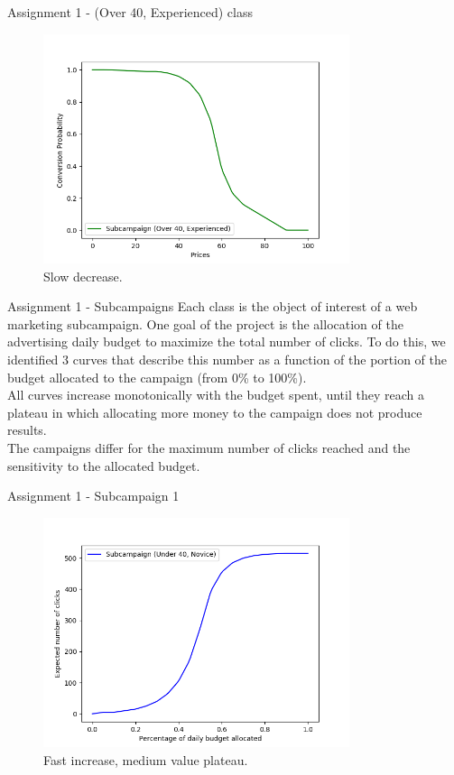 \documentclass[11pt]{beamer}
\begin{document}
\begin{frame}{Assignment 1 - (Over 40, Experienced) class}
\begin{figure}[hbtp]
\centering
\includegraphics[width=0.8\textwidth]{images/demand_curve_1.png}
\caption{Slow decrease.}
\end{figure}
\end{frame}

\begin{frame}{Assignment 1 - Subcampaigns}
Each class is the object of interest of a web marketing subcampaign.
One goal of the project is the allocation of the advertising daily budget to maximize the total number of clicks. 
To do this, we identified 3 curves that describe this number as a function of the portion of the budget allocated to the campaign (from 0\% to 100\%).\\
All curves increase monotonically with the budget spent, until they reach a plateau in which allocating more money to the campaign does not produce results.\\
The campaigns differ for the maximum number of clicks reached and the sensitivity to the allocated budget.

\end{frame}

\begin{frame}{Assignment 1 - Subcampaign 1}
\begin{figure}[hbtp]
\centering
\includegraphics[width=0.8\textwidth]{images/subcampaign_2.png}
\caption{Fast increase, medium value plateau.}
\end{figure}
\end{frame}
\end{document}
